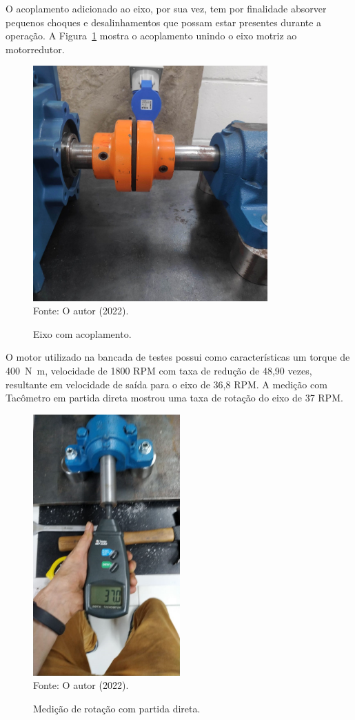 \documentclass[
	12pt,				
	oneside,			
	a4paper,			
	english,			
	brazil,			
	]{abntex2ppgsi}
\begin{document}
O acoplamento adicionado ao eixo, por sua vez, tem por finalidade absorver pequenos choques e desalinhamentos que possam estar presentes durante a operação. A Figura~\ref{acoplamento_eixo} mostra o acoplamento unindo o eixo motriz ao motorredutor. 

\begin{figure}[H]
\centering
\caption {Eixo com acoplamento.} 
\includegraphics[width=\textwidth,height=90mm,keepaspectratio]{acoplamento_eixo} \\
Fonte: O autor (2022).
\label{acoplamento_eixo}
\end{figure}
 
O motor utilizado na bancada de testes possui como características um torque de \SI{400}{\newton\metre}, velocidade de 1800 RPM com taxa de redução de 48,90 vezes, resultante em velocidade de saída para o eixo de 36,8 RPM. A medição com Tacômetro em partida direta mostrou uma taxa de rotação do eixo de 37 RPM. 

\begin{figure}[H]
\centering
\caption {Medição de rotação com partida direta.}
\includegraphics[width=\textwidth,height=100mm,keepaspectratio]{tacometro_lucas} \\
Fonte: O autor (2022).
\label{tacometro_lucas}
\end{figure}
 
\end{document}
